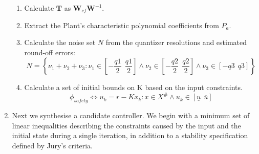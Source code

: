 \documentclass[runningheads,a4paper]{llncs}
\newcommand{\mat}[1]{\boldsymbol{#1}}
\begin{document}
\begin{enumerate}
\begin{enumerate}
\item Calculate $\mat{T}$ as $\mat{W}_{cf}\mat{W}^{-1}$. %
\item Extract the Plant's characteristic polynomial coefficients from $P_a$. %
\item Calculate the noise set $N$ from the quantizer resolutions and estimated round-off errors: %
$$N=\left \{ \nu_1+\nu_2+ \nu_3 : \nu_1 \in \left[-\frac{q1}{2}\ \ \frac{q1}{2}\right] 
\wedge \nu_2 \in \left[-\frac{q2}{2}\ \ \frac{q2}{2}\right]  \wedge \nu_3 \in \left[-q3\ \ q3\right]  \right \}\nonumber$$
\item Calculate a set of initial bounds on K based on the input constraints. $$\phi_{safety} \Leftrightarrow u_k=r-Kx_k : x \in X^\# \wedge u_k \in [\underline{u}\ \ \overline{u}]$$
\end{enumerate}
\item Next we synthesise a candidate controller. 
We begin with a minimum set of linear inequalities describing the constraints caused by the input and the initial state during a single iteration, in addition to a stability specification defined by Jury's criteria. %


\end{enumerate}
\end{document}
